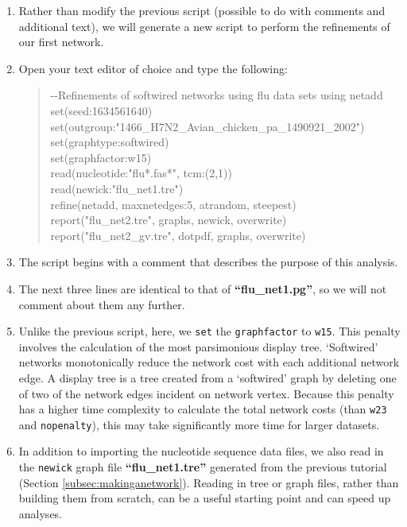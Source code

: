 \documentclass[11pt]{article}
\begin{document}
\begin {enumerate}

\item Rather than modify the previous script (possible to do with comments and 
additional text), we will generate a new script to perform the refinements of our
first network.

\item Open your text editor of choice and type the following:

	\begin{quote}	
	-\/-Refinements of softwired networks using flu data sets using netadd\\
	set(seed:1634561640)\\
	set(outgroup:"1466\_H7N2\_Avian\_chicken\_pa\_1490921\_2002")\\
	set(graphtype:softwired)\\
	set(graphfactor:w15)\\ 
	read(nucleotide:"flu*.fas*", tcm:(2,1))\\
	read(newick:"flu\_net1.tre")\\
	refine(netadd, maxnetedges:5, atrandom, steepest)\\
	report("flu\_net2.tre", graphs, newick, overwrite)\\
	report("flu\_net2\_gv.tre", dotpdf, graphs, overwrite)
	\end{quote}

\item The script begins with a comment that describes the purpose of this 
analysis.

\item The next three lines are identical to that of \textbf{``flu\_net1.pg''}, so we 
will not comment about them any further. 

\item Unlike the previous script, here, we \texttt{set} the \texttt{graphfactor} to 
\texttt{w15}. This penalty involves the calculation of the most parsimonious 
display tree. `Softwired' networks monotonically reduce the network cost 
with each additional network edge. A display tree is a tree created from a 
`softwired' graph by deleting one of two of the network edges incident on 
network vertex. Because this penalty has a higher time complexity to calculate 
the total network costs (than \texttt{w23} and \texttt{nopenalty}), this may take 
significantly more time for larger datasets. 

\item In addition to importing the nucleotide sequence data files, we also
read in the \texttt{newick} graph file \textbf{``flu\_net1.tre''} generated from the 
previous tutorial (Section \ref{subsec:makinganetwork}). Reading in tree or graph 
files, rather than building them from scratch, can be a useful starting point and 
can speed up analyses.


\end{enumerate}
\end{document}
